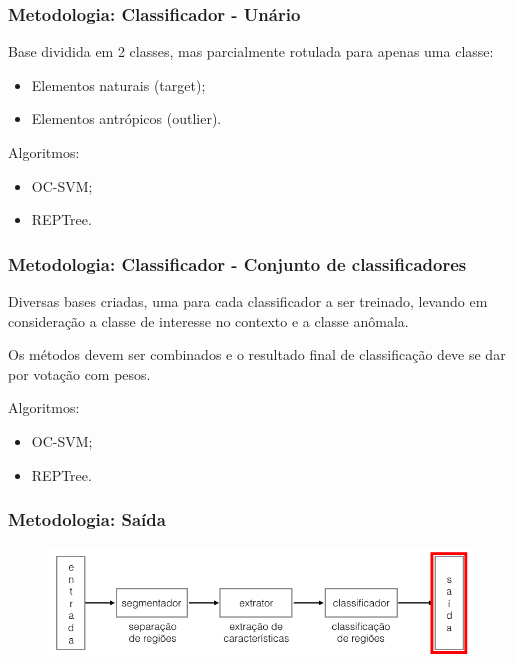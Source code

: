 \documentclass[t]{beamer}
\begin{document}
\begin{frame}[c]
	\frametitle{Metodologia: Classificador - Unário}

	Base dividida em 2 classes, mas parcialmente rotulada para apenas uma classe:
	\vspace{0.3cm}
	\begin{itemize}
    	\item Elementos naturais (target);
    	\item Elementos antrópicos (outlier).
	\end{itemize}

	\vspace{0.5cm}

	Algoritmos:
	\begin{itemize}
		\item OC-SVM;
		\item REPTree.
	\end{itemize}

\end{frame}

\begin{frame}[c]
	\frametitle{Metodologia: Classificador - Conjunto de classificadores}
	
	Diversas bases criadas, uma para cada classificador a ser treinado, levando em consideração a classe de interesse no contexto e a classe anômala.

	\vspace{0.5cm}
	
	Os métodos devem ser combinados e o resultado final de classificação deve se dar por votação com pesos.

	\vspace{0.5cm}

	Algoritmos:
	\begin{itemize}
		\item OC-SVM;
		\item REPTree.
	\end{itemize}
	
\end{frame}

\begin{frame}[c]
	\frametitle{Metodologia: Saída}
	\begin{figure}[h]
    	\includegraphics[width=\textwidth]{imgs/arquitetura_5}
	\end{figure}
\end{frame}
\end{document}
